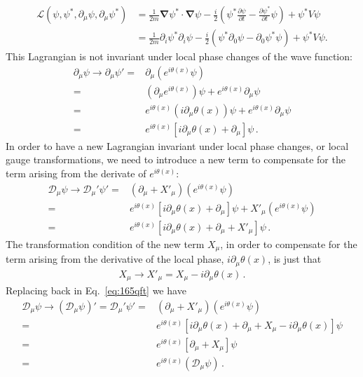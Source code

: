 \begin{align}
  \mathcal{L}(\psi,\psi^*,\partial_\mu\psi,\partial_\mu\psi^*)&=\frac{1}{2m}\boldsymbol{\nabla}\psi^*\cdot\boldsymbol{\nabla}\psi-\frac{i}{2}
  \left(
\psi^*\frac{\partial\psi}{\partial t}-\frac{\partial\psi^*}{\partial t}\psi
  \right)+\psi^*V\psi\\
&=\frac{1}{2m}\partial_i\psi^*\partial_i\psi-\frac{i}{2}
  \left(\psi^*\partial_0\psi-\partial_0\psi^*\psi\right)+\psi^*V\psi.\nonumber
\end{align}
This Lagrangian is not invariant under local phase changes of the wave function: 
\begin{align}
  \partial_\mu \psi\to\partial_\mu \psi'=&\partial_\mu \left(e^{i\theta(x)}\psi\right)\nonumber\\
  =&\left(\partial_\mu e^{i\theta(x)}\right)\psi+e^{i\theta(x)}\partial_\mu\psi\nonumber\\
  =&e^{i\theta(x)}\left(i\partial_\mu \theta(x)\right)\psi+e^{i\theta(x)}\partial_\mu\psi\nonumber\\
  =&e^{i\theta(x)}\left[i\partial_\mu \theta(x)+\partial_\mu\right]\psi\,.
\end{align}
In order to have a new Lagrangian invariant under local phase changes, or local gauge transformations, we need to introduce a new term to compensate for the term arising from the derivate of $e^{i\theta(x)}$:
\begin{align}
\label{eq:165qft}
   \mathcal{D}_\mu \psi\to\mathcal{D}_\mu' \psi'=&(\partial_\mu+X'_\mu) \left(e^{i\theta(x)}\psi\right)\nonumber\\
   =&e^{i\theta(x)}\left[i\partial_\mu \theta(x)+\partial_\mu\right]\psi+X'_\mu \left(e^{i\theta(x)}\psi\right)\nonumber\\
   =&e^{i\theta(x)}\left[i\partial_\mu \theta(x)+\partial_\mu+X'_\mu \right]\psi\,.
\end{align}
The transformation condition of the new term $X_\mu$, in order to compensate for the term arising from the derivative of the local phase, $i\partial_\mu\theta(x)$, is just that
\begin{align}
\label{eq:169qft}
X_\mu\to  X'_\mu=X_\mu-i\partial_\mu\theta(x)\,.
\end{align}
Replacing back in Eq.~\eqref{eq:165qft} we have
\begin{align}
    \mathcal{D}_\mu \psi\to\left(\mathcal{D}_\mu \psi\right)'=\mathcal{D}_\mu' \psi'=&(\partial_\mu+X'_\mu) \left(e^{i\theta(x)}\psi\right)\nonumber\\
=&e^{i\theta(x)}\left[i\partial_\mu \theta(x)+\partial_\mu+X_\mu-i\partial_\mu\theta(x) \right]\psi\nonumber\\
=&e^{i\theta(x)}\left[\partial_\mu+X_\mu\right]\psi\nonumber\\
=&e^{i\theta(x)}\left(\mathcal{D}_\mu\psi\right)\,.
\end{align}
